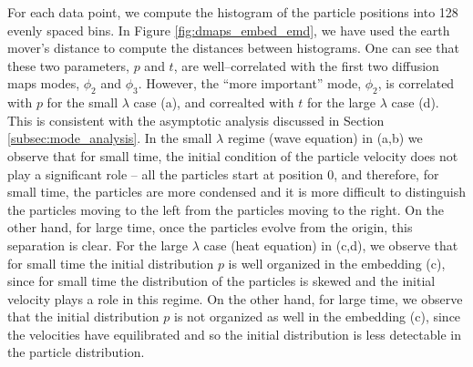 \documentclass[prl,reprint]{revtex4-1}
\begin{document}
For each data point, we compute the histogram of the particle positions into 128 evenly spaced bins. 
%
In Figure \ref{fig:dmaps_embed_emd}, we have used the earth mover's distance to compute the distances between histograms.
%
One can see that these two parameters, $p$ and $t$, are well--correlated with the first two diffusion maps modes, $\phi_2$ and $\phi_3$. 
%
However, the ``more important'' mode, $\phi_2$, is correlated with $p$ for the small $\lambda$ case (a), and correalted with $t$ for the large $\lambda$ case (d). This is consistent with the asymptotic analysis discussed in Section \ref{subsec:mode_analysis}. 
%
In the small $\lambda$ regime (wave equation) in (a,b) we observe that for small time, the initial condition of the particle velocity does not play a significant role -- all the particles start at position $0$, and therefore, for small time, the particles are more condensed and it is more difficult to distinguish the particles moving to the left from the particles moving to the right. On the other hand, for large time, once the particles evolve from the origin, this separation is clear.  
%
For the large $\lambda$ case (heat equation) in (c,d), we observe that for small time the initial distribution $p$ is well organized in the embedding (c), since for small time the distribution of the particles is skewed and the initial velocity plays a role in this regime. 
%
On the other hand, for large time, we observe that the initial distribution $p$ is not organized as well in the embedding (c), since the velocities have equilibrated and so the initial distribution is less detectable in the particle distribution.
\end{document}
